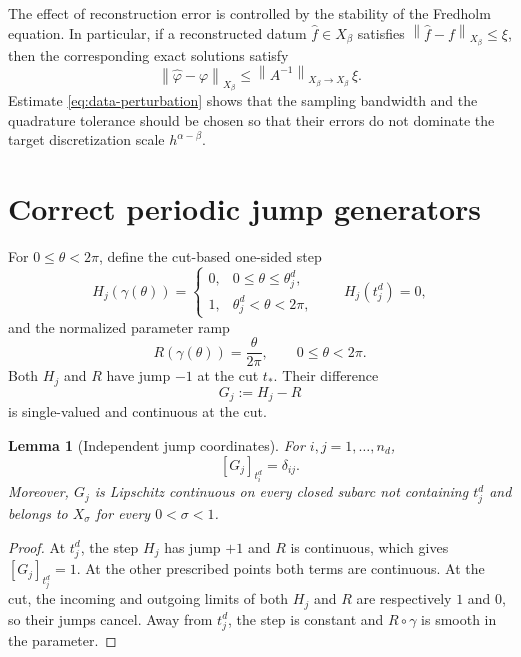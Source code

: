 \documentclass[11pt,a4paper]{amsart}
\theoremstyle{plain}
\newtheorem{lemma}[theorem]{Lemma}
\theoremstyle{definition}
\theoremstyle{remark}
\newcommand{\norm}[1]{\left\|#1\right\|}
\begin{document}
The effect of reconstruction error is controlled by the stability of the Fredholm equation.  In particular, if a reconstructed datum $\widehat f\in X_\beta$ satisfies $\norm{\widehat f-f}_{X_\beta}\le\xi$, then the corresponding exact solutions satisfy
\begin{equation}\label{eq:data-perturbation}
        \norm{\widehat\varphi-\varphi}_{X_\beta}
        \le \norm{A^{-1}}_{X_\beta\to X_\beta}\,\xi.
\end{equation}
Estimate \eqref{eq:data-perturbation} shows that the sampling bandwidth and the quadrature tolerance should be chosen so that their errors do not dominate the target discretization scale $h^{\alpha-\beta}$.

\section{Correct periodic jump generators}\label{sec:generators}

For $0\le\theta<2\pi$, define the cut-based one-sided step
\begin{equation}\label{eq:Hj}
 H_j(\gamma(\theta))=
 \begin{cases}
 0,&0\le\theta\le\theta_j^d,\\
 1,&\theta_j^d<\theta<2\pi,
 \end{cases}
 \qquad H_j(t_j^d)=0,
\end{equation}
and the normalized parameter ramp
\begin{equation}\label{eq:ramp}
        R(\gamma(\theta))=\frac{\theta}{2\pi},
        \qquad 0\le\theta<2\pi.
\end{equation}
Both $H_j$ and $R$ have jump $-1$ at the cut $t_*$.  Their difference
\begin{equation}\label{eq:Gj}
        G_j:=H_j-R
\end{equation}
is single-valued and continuous at the cut.

\begin{lemma}[Independent jump coordinates]\label{lem:generatorjumps}
For $i,j=1,\ldots,n_d$,
\begin{equation}\label{eq:jumpmatrix}
        [G_j]_{t_i^d}=\delta_{ij}.
\end{equation}
Moreover, $G_j$ is Lipschitz continuous on every closed subarc not containing $t_j^d$ and belongs to $X_\sigma$ for every $0<\sigma<1$.
\end{lemma}

\begin{proof}
At $t_j^d$, the step $H_j$ has jump $+1$ and $R$ is continuous, which gives $[G_j]_{t_j^d}=1$.  At the other prescribed points both terms are continuous.  At the cut, the incoming and outgoing limits of both $H_j$ and $R$ are respectively $1$ and $0$, so their jumps cancel.  Away from $t_j^d$, the step is constant and $R\circ\gamma$ is smooth in the parameter.
\end{proof}
\end{document}
